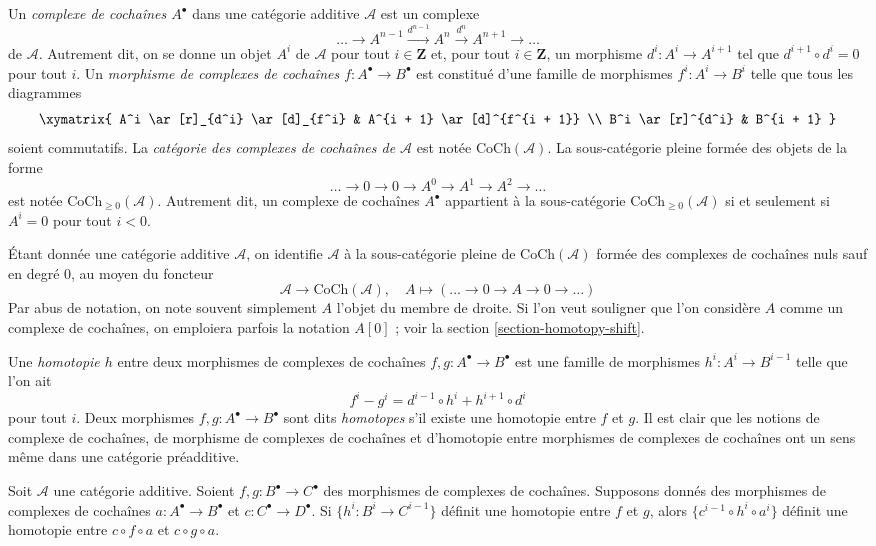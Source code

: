 \noindent
Un {\it complexe de cochaînes $A^\bullet$} dans une catégorie additive $\mathcal{A}$
est un complexe
$$
\ldots \to
A^{n - 1} \xrightarrow{d^{n - 1}}
A^n \xrightarrow{d^n}
A^{n + 1} \to
\ldots
$$
de $\mathcal{A}$. Autrement dit, on se donne un objet $A^i$ de
$\mathcal{A}$ pour tout $i \in \mathbf{Z}$ et, pour
tout $i \in \mathbf{Z}$, un morphisme $d^i : A^i \to A^{i + 1}$ tel que
$d^{i + 1} \circ d^i = 0$ pour tout $i$. Un {\it morphisme de complexes
de cochaînes $f : A^\bullet \to B^\bullet$} est constitué d'une
famille de morphismes $f^i : A^i \to B^i$ telle que tous
les diagrammes
$$
\xymatrix{
A^i \ar[r]_{d^i} \ar[d]_{f^i} & A^{i + 1} \ar[d]^{f^{i + 1}} \\
B^i \ar[r]^{d^i} & B^{i + 1}
}
$$
soient commutatifs. La {\it catégorie des complexes de cochaînes de $\mathcal{A}$}
est notée $\text{CoCh}(\mathcal{A})$. La sous-catégorie pleine formée
des objets de la forme
$$
\ldots \to 0 \to 0 \to A^0 \to A^1 \to A^2 \to \ldots
$$
est notée $\text{CoCh}_{\geq 0}(\mathcal{A})$.
Autrement dit, un complexe de cochaînes $A^\bullet$ appartient à la sous-catégorie
$\text{CoCh}_{\geq 0}(\mathcal{A})$ si et seulement si
$A^i = 0$ pour tout $i < 0$.

\medskip\noindent
Étant donnée une catégorie additive $\mathcal{A}$, on identifie $\mathcal{A}$
à la sous-catégorie pleine de $\text{CoCh}(\mathcal{A})$ formée
des complexes de cochaînes nuls sauf en degré $0$, au moyen du foncteur
$$
\mathcal{A} \longrightarrow \text{CoCh}(\mathcal{A}),\quad
A \longmapsto (\ldots \to 0 \to A \to 0 \to \ldots)
$$
Par abus de notation, on note souvent simplement $A$ l'objet du membre de droite.
Si l'on veut souligner que l'on considère $A$ comme un complexe de cochaînes,
on emploiera parfois la notation $A[0]$ ; voir la
section \ref{section-homotopy-shift}.

\medskip\noindent
Une {\it homotopie $h$} entre deux morphismes
de complexes de cochaînes $f, g : A^\bullet \to B^\bullet$
est une famille de morphismes $h^i : A^i \to B^{i - 1}$
telle que l'on ait
$$
f^i - g^i = d^{i - 1} \circ h^i + h^{i + 1} \circ d^i
$$
pour tout $i$.
Deux morphismes $f, g : A^\bullet \to B^\bullet$ sont dits
{\it homotopes} s'il existe une homotopie entre $f$
et $g$.
Il est clair que les notions de complexe de cochaînes, de morphisme de
complexes de cochaînes et d'homotopie entre morphismes de complexes de cochaînes
ont un sens même dans une catégorie préadditive.

\begin{lemma}
\label{lemma-compose-homotopy-cochain}
Soit $\mathcal{A}$ une catégorie additive.
Soient $f, g : B^\bullet \to C^\bullet$ des morphismes
de complexes de cochaînes. Supposons donnés des morphismes de complexes de
cochaînes $a : A^\bullet \to B^\bullet$ et
$c : C^\bullet \to D^\bullet$.
Si $\{h^i : B^i \to C^{i - 1}\}$ définit une homotopie
entre $f$ et $g$, alors $\{c^{i - 1} \circ h^i \circ a^i\}$
définit une homotopie entre $c \circ f \circ a$ et
$c \circ g \circ a$.
\end{lemma}

